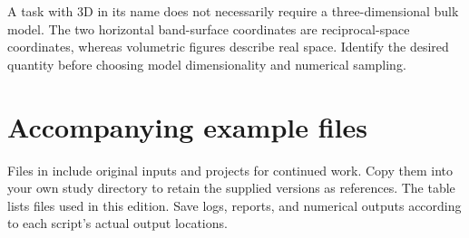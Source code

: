 A task with 3D in its name does not necessarily require a three-dimensional bulk model. The two horizontal band-surface coordinates are reciprocal-space coordinates, whereas volumetric figures describe real space. Identify the desired quantity before choosing model dimensionality and numerical sampling.

\FloatBarrier
\section{Accompanying example files}

Files in  include original inputs and projects for continued work. Copy them into your own study directory to retain the supplied versions as references. The table lists files used in this edition. Save logs, reports, and numerical outputs according to each script's actual output locations.

